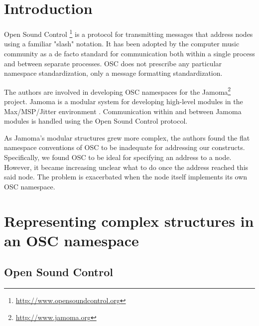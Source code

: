 \documentclass{sig-alternate}
\begin{document}




\section{Introduction} %
\label{sec:introduction}

Open Sound Control \footnote{\url{http://www.opensoundcontrol.org}} is a protocol for transmitting messages that address nodes using a familiar "slash" notation.  It has been adopted by the computer music community as a de facto standard for communication both within a single process and between separate processes.  OSC does not prescribe any particular namespace standardization, only a message formatting standardization.

The authors are involved in developing OSC namespaces for the Jamoma\footnote{\url{http://www.jamoma.org}} project.
Jamoma is a modular system for developing high-level modules in the Max/MSP/Jitter environment \cite{Place:2006}.  Communication within and between Jamoma modules is handled using the Open Sound Control protocol. 

As Jamoma's modular structures grew more complex, the authors found the flat namespace conventions of OSC to be inadequate for addressing our constructs.  Specifically, we found OSC to be ideal for specifying an address to a node.  However, it became increasing unclear what to do once the address reached this said node.  The problem is exacerbated when the node itself implements its own OSC namespace.





\section{Representing complex structures in an OSC namespace} %
\label{sec:representing_complex_structures_in_an_OSC_namespace}


\subsection{Open Sound Control}
\end{document}
